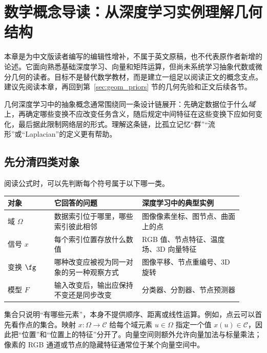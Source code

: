 \chapter{数学概念导读：从深度学习实例理解几何结构}
\label{app:primer:chapter}

\begin{tcolorbox}[width=\linewidth,colback=boxgray!45,colframe=darkgry,title=附录身份与使用方式]
本章是为中文版读者编写的编辑性增补，不属于英文原稿，也不代表原作者新增的论述。它面向熟悉基础深度学习、向量和矩阵运算，但尚未系统学习抽象代数或微分几何的读者。目标不是替代数学教材，而是建立一组足以阅读正文的概念支点。建议先阅读本章，再回到第~\ref{sec:geom_priors} 节的几何先验和正文后续各节。
\end{tcolorbox}

几何深度学习中的抽象概念通常围绕同一条设计链展开：先确定数据位于什么\emph{域}上，再确定哪些变换不应改变任务含义，随后规定中间特征在这些变换下应如何变化，最后据此限制网络层的形式。理解这条链，比孤立记忆“群”“流形”或“Laplacian”的定义更有帮助。

\section{先分清四类对象}
\label{app:primer:objects}

阅读公式时，可以先判断每个符号属于以下哪一类。

\begin{center}
\small
\begin{tabular}{@{}p{0.18\linewidth}p{0.34\linewidth}p{0.39\linewidth}@{}}
\toprule
对象 & 它回答的问题 & 深度学习中的典型实例 \\
\midrule
域 $\Omega$ & 数据索引位于哪里，哪些索引彼此相邻 & 图像像素坐标、图节点、曲面上的点 \\
信号 $x$ & 每个索引位置存放什么数值 & RGB 值、节点特征、温度场、3D 向量特征 \\
变换 $\fg$ & 哪种改变应被视为同一对象的另一种观察方式 & 图像平移、节点重编号、3D 旋转 \\
模型 $F$ & 输入改变后，输出应保持不变还是同步改变 & 分类器、分割器、节点预测器 \\
\bottomrule
\end{tabular}
\end{center}

集合只说明“有哪些元素”，本身不提供顺序、距离或线性运算。例如，点云可以首先看作点的集合。映射 $x:\Omega\rightarrow\mathcal{C}$ 给每个域元素 $u\in\Omega$ 指定一个值 $x(u)\in\mathcal{C}$，因此把“位置”和“位置上的特征”分开了。向量空间则额外允许向量加法与标量乘法；像素的 RGB 通道或节点的隐藏特征通常位于某个向量空间中。


